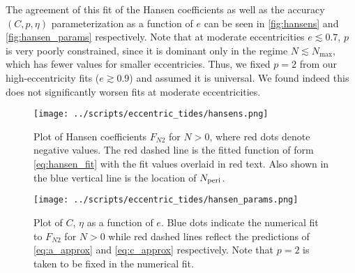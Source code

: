 \documentclass[
        fleqn,
        usenatbib,
        referee,
    ]{mnras}
\newcommand*{\p}[1]{\left(#1\right)}
\begin{document}
The agreement of this fit of the Hansen coefficients as well as the accuracy
$\p{C, p, \eta}$ parameterization as a function of $e$ can be seen in
\autoref{fig:hansens} and \autoref{fig:hansen_params} respectively. Note that at
moderate eccentricities $e \lesssim 0.7$, $p$ is very poorly constrained, since
it is dominant only in the regime $N \lesssim N_{\max}$, which has fewer values
for smaller eccentricies. Thus, we fixed $p = 2$ from our high-eccentricity fits
($e \gtrsim 0.9$) and assumed it is universal. We found indeed this does not
significantly worsen fits at moderate eccentricities.
\begin{figure}
    \centering
    \texttt{[image: ../scripts/eccentric\_tides/hansens.png]}
    \caption{Plot of Hansen coefficients $F_{N2}$ for $N > 0$, where red dots
    denote negative values. The red dashed line is the fitted function of form
    \autoref{eq:hansen_fit} with the fit values overlaid in red text. Also shown
    in the blue vertical line is the location of $N_{\rm
    peri}$.}\label{fig:hansens}
\end{figure}
\begin{figure}
    \centering
    \texttt{[image: ../scripts/eccentric\_tides/hansen\_params.png]}
    \caption{Plot of $C$, $\eta$ as a function of $e$. Blue dots indicate the
    numerical fit to $F_{N2}$ for $N > 0$ while red dashed lines reflect the
    predictions of \autoref{eq:a_approx} and \autoref{eq:c_approx} respectively.
    Note that $p = 2$ is taken to be fixed in the numerical
    fit.}\label{fig:hansen_params}
\end{figure}





\bsp
\label{lastpage} %
\end{document}
